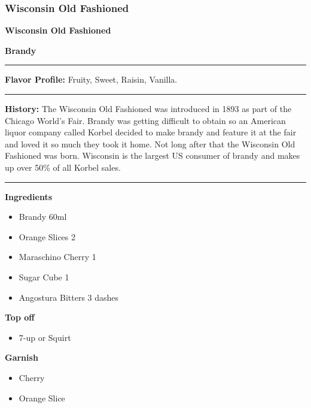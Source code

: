 \subsubsection{Wisconsin Old Fashioned}
\noindent
\begin{minipage}{.49\textwidth}
    \noindent\textbf{\large Wisconsin Old Fashioned}
\end{minipage}
\hspace{.02\textwidth}
\begin{minipage}{.49\textwidth}
    \raggedleft
    \textbf{\large Brandy}\\
\end{minipage}
\vspace{.5em}\hrule\vspace{.5em}
\noindent
\textbf{\large Flavor Profile:} Fruity, Sweet, Raisin, Vanilla.
\vspace{.5em}\hrule\vspace{.5em}
\noindent
\textbf{\large History:} The Wisconsin Old Fashioned was introduced in 1893 as part of the Chicago World's Fair. Brandy was getting difficult to obtain so an American liquor company called Korbel decided to make brandy and feature it at the fair and loved it so much they took it home. Not long after that the Wisconsin Old Fashioned was born. Wisconsin is the largest US consumer of brandy and makes up over 50\% of all Korbel sales.
\vspace{.5em}\hrule\vspace{.5em}
\noindent
\begin{minipage}[t]{.49\textwidth}
    \noindent
    \textbf{\large Ingredients}
    \begin{itemize}
        \item Brandy 60ml
        \item Orange Slices 2
        \item Maraschino Cherry 1
        \item Sugar Cube 1
        \item Angostura Bitters 3 dashes
    \end{itemize}
    \noindent
    \textbf{\large Top off}
    \begin{itemize}
        \item 7-up or Squirt
    \end{itemize}
    \noindent
    \textbf{\large Garnish}
    \begin{itemize}
        \item Cherry
        \item Orange Slice
    \end{itemize}
\end{minipage}
